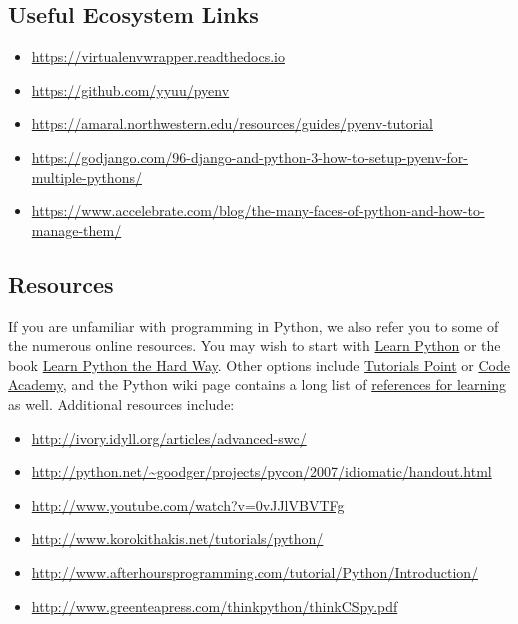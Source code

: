 \subsection{Useful Ecosystem Links}
\label{\detokenize{lesson/prg/python_intro:useful-ecosystem-links}}\begin{itemize}
\item {} 
\url{https://virtualenvwrapper.readthedocs.io}

\item {} 
\url{https://github.com/yyuu/pyenv}

\item {} 
\url{https://amaral.northwestern.edu/resources/guides/pyenv-tutorial}

\item {} 
\url{https://godjango.com/96-django-and-python-3-how-to-setup-pyenv-for-multiple-pythons/}

\item {} 
\url{https://www.accelebrate.com/blog/the-many-faces-of-python-and-how-to-manage-them/}

\end{itemize}


\subsection{Resources}
\label{\detokenize{lesson/prg/python_intro:resources}}\label{\detokenize{lesson/prg/python_intro:python-resources}}
If you are unfamiliar with programming in Python, we also refer you
to some of the numerous online resources. You may wish to start with
\href{https://www.learnpython.org}{Learn Python} or the book \href{http://learnpythonthehardway.org/book/}{Learn Python the Hard Way}. Other
options include \href{http://www.tutorialspoint.com/python/}{Tutorials Point} or \href{http://www.codecademy.com/en/tracks/python}{Code Academy}, and the Python wiki page
contains a long list of \href{https://wiki.python.org/moin/BeginnersGuide/Programmers}{references for learning} as well.
Additional resources include:
\begin{itemize}
\item {} 
\url{http://ivory.idyll.org/articles/advanced-swc/}

\item {} 
\url{http://python.net/~goodger/projects/pycon/2007/idiomatic/handout.html}

\item {} 
\url{http://www.youtube.com/watch?v=0vJJlVBVTFg}

\item {} 
\url{http://www.korokithakis.net/tutorials/python/}

\item {} 
\url{http://www.afterhoursprogramming.com/tutorial/Python/Introduction/}

\item {} 
\url{http://www.greenteapress.com/thinkpython/thinkCSpy.pdf}

\end{itemize}

